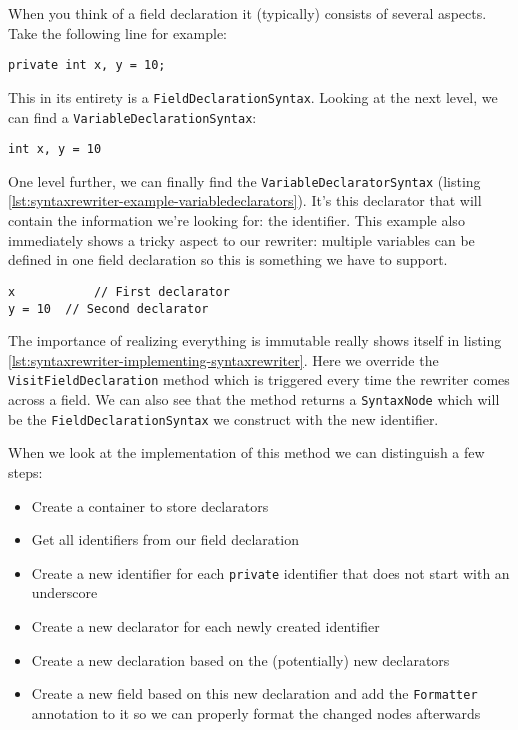When you think of a field declaration it (typically) consists of several aspects. Take the following line for example: 

\begin{lstlisting}[label={lst:syntaxrewriter-example-fielddeclaration}]
private int x, y = 10;
\end{lstlisting}

This in its entirety is a \texttt{FieldDeclarationSyntax}. Looking at the next level, we can find a \texttt{VariableDeclarationSyntax}:

\begin{lstlisting}[label={lst:syntaxrewriter-example-variabledeclaration}]
int x, y = 10
\end{lstlisting}

One level further, we can finally find the \texttt{VariableDeclaratorSyntax} (listing \ref{lst:syntaxrewriter-example-variabledeclarators}). It's this declarator that will contain the information we're looking for: the identifier. This example also immediately shows a tricky aspect to our rewriter: multiple variables can be defined in one field declaration so this is something we have to support.

\begin{lstlisting}[label={lst:syntaxrewriter-example-variabledeclarators}]
x 			// First declarator
y = 10 	// Second declarator
\end{lstlisting}

The importance of realizing everything is \gls{immutable} really shows itself in listing \ref{lst:syntaxrewriter-implementing-syntaxrewriter}. Here we override the \texttt{VisitFieldDeclaration} method which is triggered every time the rewriter comes across a field. We can also see that the method returns a \texttt{SyntaxNode} which will be the \texttt{FieldDeclarationSyntax} we construct with the new identifier.

When we look at the implementation of this method we can distinguish a few steps:

\begin{itemize}
\item Create a container to store declarators
\item Get all identifiers from our field declaration
\item Create a new identifier for each \texttt{private} identifier that does not start with an underscore
\item Create a new declarator for each newly created identifier
\item Create a new declaration based on the (potentially) new declarators
\item Create a new field based on this new declaration and add the \texttt{Formatter} annotation to it so we can properly format the changed nodes afterwards
\end{itemize}

